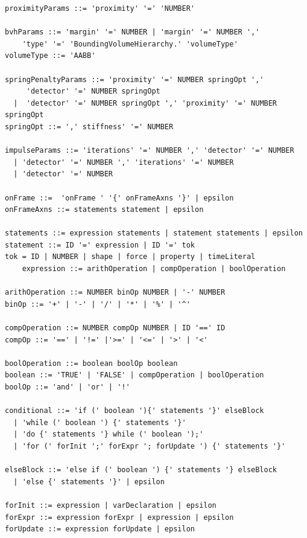 \begin{verbatim}
proximityParams ::= 'proximity' '=' 'NUMBER'

bvhParams ::= 'margin' '=' NUMBER | 'margin' '=' NUMBER ',' 
    'type' '=' 'BoundingVolumeHierarchy.' 'volumeType'
volumeType ::= 'AABB'

springPenaltyParams ::= 'proximity' '=' NUMBER springOpt ',' 
     'detector' '=' NUMBER springOpt
  |  'detector' '=' NUMBER springOpt ',' 'proximity' '=' NUMBER springOpt
springOpt ::= ',' stiffness' '=' NUMBER 

impulseParams ::= 'iterations' '=' NUMBER ',' 'detector' '=' NUMBER 
  | 'detector' '=' NUMBER ',' 'iterations' '=' NUMBER
  | 'detector' '=' NUMBER

onFrame ::=  'onFrame ' '{' onFrameAxns '}' | epsilon
onFrameAxns ::= statements statement | epsilon

statements ::= expression statements | statement statements | epsilon
statement ::= ID '=' expression | ID '=' tok
tok = ID | NUMBER | shape | force | property | timeLiteral
	expression ::= arithOperation | compOperation | boolOperation

arithOperation ::= NUMBER binOp NUMBER | '-' NUMBER
binOp ::= '+' | '-' | '/' | '*' | '%' | '^'

compOperation ::= NUMBER compOp NUMBER | ID '==' ID
compOp ::= '==' | '!=' |'>=' | '<=' | '>' | '<'

boolOperation ::= boolean boolOp boolean
boolean ::= 'TRUE' | 'FALSE' | compOperation | boolOperation
boolOp ::= 'and' | 'or' | '!'

conditional ::= 'if (' boolean '){' statements '}' elseBlock 
  | 'while (' boolean ') {' statements '}' 
  | 'do {' statements '} while (' boolean ');' 
  | 'for (' forInit ';' forExpr '; forUpdate ') {' statements '}'

elseBlock ::= 'else if (' boolean ') {' statements '} elseBlock 
  | 'else {' statements '}' | epsilon

forInit ::= expression | varDeclaration | epsilon
forExpr ::= expression forExpr | expression | epsilon
forUpdate ::= expression forUpdate | epsilon

\end{verbatim}
